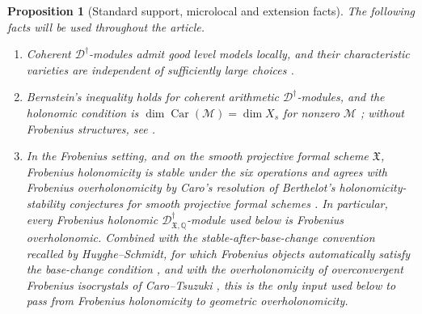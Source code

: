 \documentclass[11pt]{amsart}
\theoremstyle{plain}
\newtheorem{proposition}{Proposition}[section]
\theoremstyle{definition}
\theoremstyle{remark}
\newcommand{\Car}{\operatorname{Car}}
\begin{document}
\begin{proposition}[Standard support, microlocal and extension facts]
\label{prop:standard-facts}
The following facts will be used throughout the article.
\begin{enumerate}[label=\textup{(\roman*)}]
\item Coherent \(\mathscr D^\dagger\)-modules admit good level models locally,
and their characteristic varieties are independent of sufficiently large choices
\cite[5.3.2--5.3.4]{BerthelotIntro}.
\item Bernstein's inequality holds for coherent arithmetic \(\mathscr D^\dagger\)-modules, and the holonomic condition is
\(\dim\Car(\mathcal M)=\dim X_s\) for nonzero \(\mathcal M\)
\cite[5.3.4--5.3.5]{BerthelotIntro}; without Frobenius structures, see
\cite[Th\'eor\`eme 2.2.8]{CaroHolonomieSansFrobenius}.
\item In the Frobenius setting, and on the smooth projective formal scheme
\(\mathfrak X\), Frobenius holonomicity is stable under the six operations and
agrees with Frobenius overholonomicity by Caro's resolution of Berthelot's
holonomicity-stability conjectures for smooth projective formal schemes
\cite[\S2.1]{CaroStabiliteHolonomie}.  In particular, every Frobenius
holonomic \(\mathscr D^\dagger_{\mathfrak X,\mathbb Q}\)-module used below is
Frobenius overholonomic.  Combined with the stable-after-base-change convention
recalled by Huyghe--Schmidt, for which Frobenius objects automatically satisfy
the base-change condition \cite[\S2.1, first paragraphs]{HuygheSchmidtIntermediate},
and with the overholonomicity of overconvergent Frobenius isocrystals of
Caro--Tsuzuki \cite[Abstract and Introduction]{CaroTsuzukiOverholonomicity}, this
is the only input used below to pass from Frobenius holonomicity to geometric
overholonomicity.


\end{enumerate}
\end{proposition}
\end{document}
